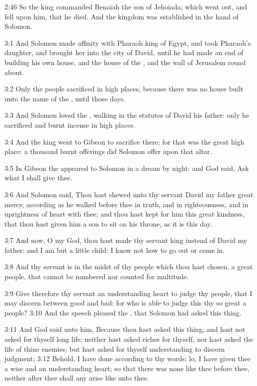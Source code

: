 2:46 So the king commanded Benaiah the son of Jehoiada; which went out, and fell upon him, that he died. And the kingdom was established in the hand of Solomon.

3:1 And Solomon made affinity with Pharaoh king of Egypt, and took Pharaoh's daughter, and brought her into the city of David, until he had made an end of building his own house, and the house of the \LORD, and the wall of Jerusalem round about.

3:2 Only the people sacrificed in high places, because there was no house built unto the name of the \LORD, until those days.

3:3 And Solomon loved the \LORD, walking in the statutes of David his father: only he sacrificed and burnt incense in high places.

3:4 And the king went to Gibeon to sacrifice there; for that was the great high place: a thousand burnt offerings did Solomon offer upon that altar.

3:5 In Gibeon the \LORD appeared to Solomon in a dream by night: and God said, Ask what I shall give thee.

3:6 And Solomon said, Thou hast shewed unto thy servant David my father great mercy, according as he walked before thee in truth, and in righteousness, and in uprightness of heart with thee; and thou hast kept for him this great kindness, that thou hast given him a son to sit on his throne, as it is this day.

3:7 And now, O \LORD my God, thou hast made thy servant king instead of David my father: and I am but a little child: I know not how to go out or come in.

3:8 And thy servant is in the midst of thy people which thou hast chosen, a great people, that cannot be numbered nor counted for multitude.

3:9 Give therefore thy servant an understanding heart to judge thy people, that I may discern between good and bad: for who is able to judge this thy so great a people?  3:10 And the speech pleased the \LORD, that Solomon had asked this thing.

3:11 And God said unto him, Because thou hast asked this thing, and hast not asked for thyself long life; neither hast asked riches for thyself, nor hast asked the life of thine enemies; but hast asked for thyself understanding to discern judgment; 3:12 Behold, I have done according to thy words: lo, I have given thee a wise and an understanding heart; so that there was none like thee before thee, neither after thee shall any arise like unto thee.


